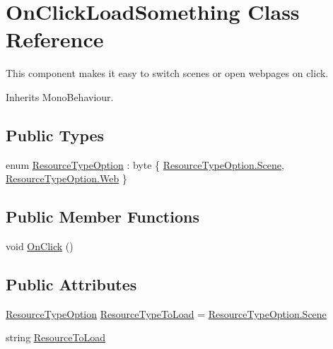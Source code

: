 \hypertarget{class_on_click_load_something}{}\section{On\+Click\+Load\+Something Class Reference}
\label{class_on_click_load_something}


This component makes it easy to switch scenes or open webpages on click.  




Inherits Mono\+Behaviour.

\subsection*{Public Types}
\begin{DoxyCompactItemize}
\item 
enum \hyperlink{class_on_click_load_something_a43b622b02426c42ad0c1f841dcaef1ba}{Resource\+Type\+Option} \+: byte \{ \hyperlink{class_on_click_load_something_a43b622b02426c42ad0c1f841dcaef1baa9ead0d38e06ec253ca0ecbf6ea56e59b}{Resource\+Type\+Option.\+Scene}, 
\hyperlink{class_on_click_load_something_a43b622b02426c42ad0c1f841dcaef1baac6e190b284633c48e39e55049da3cce8}{Resource\+Type\+Option.\+Web}
 \}
\end{DoxyCompactItemize}
\subsection*{Public Member Functions}
\begin{DoxyCompactItemize}
\item 
void \hyperlink{class_on_click_load_something_af1512a2aa80938655fd4f50b93f401b6}{On\+Click} ()
\end{DoxyCompactItemize}
\subsection*{Public Attributes}
\begin{DoxyCompactItemize}
\item 
\hyperlink{class_on_click_load_something_a43b622b02426c42ad0c1f841dcaef1ba}{Resource\+Type\+Option} \hyperlink{class_on_click_load_something_ac8ae07ff76e4759f49d73d931a46ad11}{Resource\+Type\+To\+Load} = \hyperlink{class_on_click_load_something_a43b622b02426c42ad0c1f841dcaef1baa9ead0d38e06ec253ca0ecbf6ea56e59b}{Resource\+Type\+Option.\+Scene}
\item 
string \hyperlink{class_on_click_load_something_ae51a4e24aa18f52c1c36df756c2aaab7}{Resource\+To\+Load}
\end{DoxyCompactItemize}


